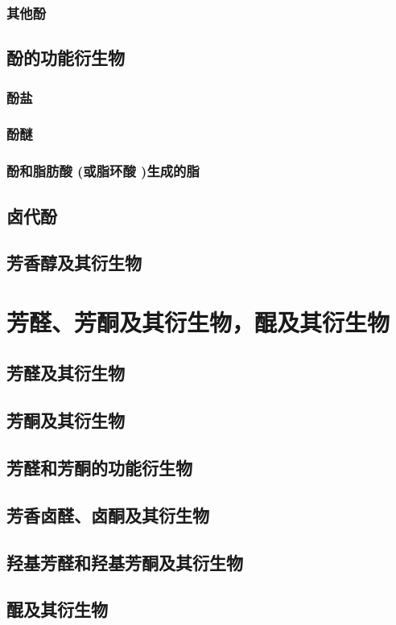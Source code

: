 \documentclass[UTF8]{../03-Chemistry}
\begin{document}
        \subsubsection{其他酚}
    \subsection{酚的功能衍生物}
        \subsubsection{酚盐}
        \subsubsection{酚醚}
        \subsubsection{酚和脂肪酸 (或脂环酸 )生成的脂}
    \subsection{卤代酚}
    \subsection{芳香醇及其衍生物}
\section{芳醛、芳酮及其衍生物，醌及其衍生物}
    \subsection{芳醛及其衍生物}
    \subsection{芳酮及其衍生物}
    \subsection{芳醛和芳酮的功能衍生物}
    \subsection{芳香卤醛、卤酮及其衍生物}
    \subsection{羟基芳醛和羟基芳酮及其衍生物}
    \subsection{醌及其衍生物}
\end{document}
